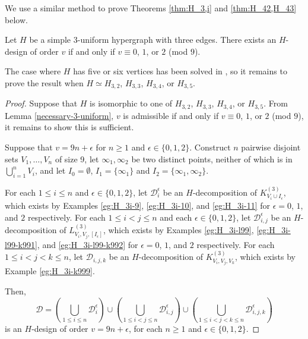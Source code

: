 We use a similar method to prove Theorems \ref{thm:H_3,i} and \ref{thm:H_42,H_43} below.

\begin{theorem} \label{thm:H_3,i}
Let $H$ be a simple $3$-uniform hypergraph with three edges.
There exists an $H$-design of order $v$ if and only if $v \equiv 0$, $1$, or $2$ (mod $9$).
\end{theorem}

The case where $H$ has five or six vertices has been solved in \cite{bryant},
so it remains to prove the result when $H \simeq H_{3,2}$, $H_{3,3}$, $H_{3,4}$, or $H_{3,5}$.

\begin{proof}
Suppose that $H$ is isomorphic to one of $H_{3,2}$, $H_{3,3}$, $H_{3,4}$, or $H_{3,5}$.
From Lemma \ref{necessary-3-uniform}, $v$ is admissible if and only if $v \equiv 0$, $1$, or $2$ (mod $9$), it remains to show this is sufficient.

Suppose that $v = 9n + \epsilon$ for $n \geq 1$ and $\epsilon \in \{0,1,2\}$.
Construct $n$ pairwise disjoint sets $V_1, \ldots, V_n$ of size 9, let $\infty_1, \infty_2$ be two distinct points, neither of which is in $\bigcup_{i=1}^{n} V_i$, and 
let $I_0 = \emptyset$, $I_1 = \{\infty_1\}$ and $I_2 = \{\infty_1, \infty_2\}$.

For each $1 \leq i \leq n$ and $\epsilon \in \{0,1,2\}$, let $\mathcal{D}_i^{\epsilon}$ be an $H$-decomposition of $K_{V_i \cup I_\epsilon}^{(3)}$,
which exists by Examples \ref{eg:H_3i-9}, \ref{eg:H_3i-10}, and \ref{eg:H_3i-11} for $\epsilon = 0$, $1$, and $2$ respectively.
%
For each $1 \leq i < j \leq n$ and each $\epsilon \in \{0,1,2\}$, let $\mathcal{D}_{i,j}^{\epsilon}$ be an $H$-decomposition of $L_{V_i, V_j, [I_\epsilon]}^{(3)}$, which exists by Examples \ref{eg:H_3i-l99}, \ref{eg:H_3i-l99-k991}, and \ref{eg:H_3i-l99-k992} for $\epsilon = 0$, $1$, and $2$ respectively.
%
For each $1 \leq i < j < k \leq n$, let $\mathcal{D}_{i,j,k}$ be an $H$-decomposition of $K_{V_i,V_j,V_k}^{(3)}$, which exists by Example \ref{eg:H_3i-k999}.

Then,
\[
    \mathcal{D} = \left( \bigcup_{1 \leq i \leq n} \mathcal{D}_{i}^{\epsilon} \right)
    \cup \left( \bigcup_{1 \leq i < j \leq n} \mathcal{D}_{i,j}^{\epsilon} \right)
    \cup \left( \bigcup_{1 \leq i < j < k \leq n} \mathcal{D}_{i,j,k}^{\epsilon} \right)
\]
is an $H$-design of order $v = 9n + \epsilon$, for each $n \geq 1$ and $\epsilon \in \{0,1,2\}$.
\end{proof}

